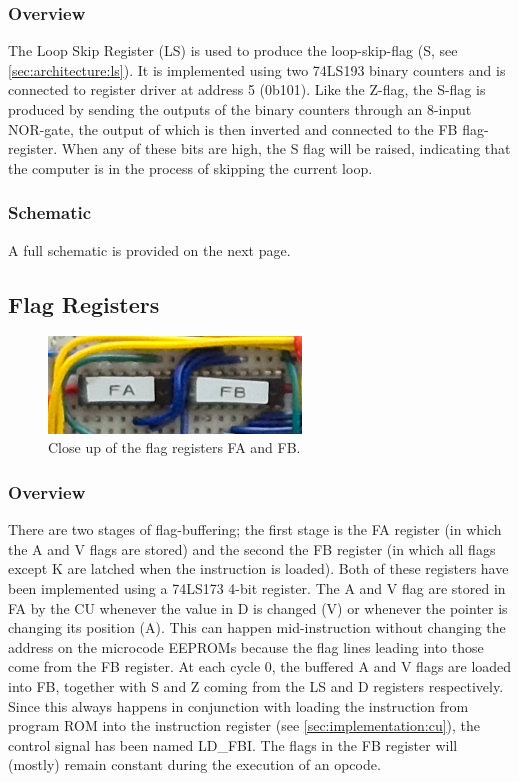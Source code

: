 \subsubsection{Overview}
The Loop Skip Register (LS) is used to produce the loop-skip-flag (S, see \ref{sec:architecture:ls}). It is implemented using two 74LS193 binary counters and is connected to register driver at address 5 (0b101). Like the Z-flag, the S-flag is produced by sending the outputs of the binary counters through an 8-input NOR-gate, the output of which is then inverted and connected to the FB flag-register. When any of these bits are high, the S flag will be raised, indicating that the computer is in the process of skipping the current loop.


\subsubsection{Schematic}
A full schematic is provided on the next page.




\subsection{Flag Registers}
\begin{figure}[H]
  \centering
  \includegraphics[width=0.6\textwidth]{img/flagregistercloseup}
  \caption{Close up of the flag registers FA and FB.}
  \label{fig:ramcloseup}
\end{figure}

\subsubsection{Overview}
There are two stages of flag-buffering; the first stage is the FA register (in which the A and V flags are stored) and the second the FB register (in which all flags except K are latched when the instruction is loaded). Both of these registers have been implemented using a 74LS173 4-bit register. The A and V flag are stored in FA by the CU whenever the value in D is changed (V) or whenever the pointer is changing its position (A). This can happen mid-instruction without changing the address on the microcode EEPROMs because the flag lines leading into those come from the FB register. At each cycle 0, the buffered A and V flags are loaded into FB, together with S and Z coming from the LS and D registers respectively. Since this always happens in conjunction with loading the instruction from program ROM into the instruction register (see \ref{sec:implementation:cu}), the control signal has been named LD\_FBI. The flags in the FB register will (mostly) remain constant during the execution of an opcode.

